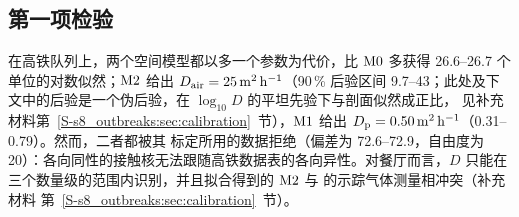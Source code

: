 \subsection{第一项检验}\label{s8_outbreaks:sec:holdout}

在高铁队列上，两个空间模型都以多一个参数为代价，比 $\mathrm{M0}$ 多获得 26.6--26.7 个单位的对数似然；$\mathrm{M2}$ 给出
$D_{\mathrm{air}}=25\,\mathrm{m}^2\,\mathrm{h}^{-1}$（90\,\% 后验区间 9.7--43；此处及下文中的后验是一个伪后验，在 $\log_{10}D$ 的平坦先验下与剖面似然成正比，
见补充材料第~\ref{S-s8_outbreaks:sec:calibration}~节），$\mathrm{M1}$ 给出 $D_{\mathrm{p}}=0.50\,\mathrm{m}^2\,\mathrm{h}^{-1}$（0.31--0.79）。然而，二者都被其
标定所用的数据拒绝（偏差为 72.6--72.9，自由度为 20）：各向同性的接触核无法跟随高铁数据表的各向异性。对餐厅而言，$D$
只能在三个数量级的范围内识别，并且拟合得到的 $\mathrm{M2}$ 与 \citet{li2021} 的示踪气体测量相冲突（补充材料
第~\ref{S-s8_outbreaks:sec:calibration}~节）。

